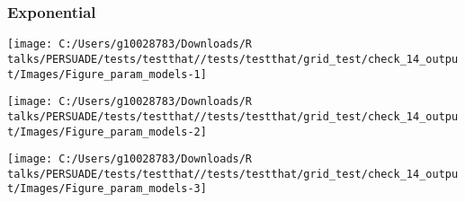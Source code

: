 \documentclass[
]{article}
\begin{document}
\clearpage

\begin{table}[H]
\centering
\caption{\label{tab:Table_2}Goodness of fit statistics}
\centering
{}
\end{table}

\clearpage

\clearpage

\subsubsection{Exponential}\label{exponential}

\begin{flushleft}\texttt{[image: C:/Users/g10028783/Downloads/R talks/PERSUADE/tests/testthat//tests/testthat/grid\_test/check\_14\_output/Images/Figure\_param\_models-1]} \end{flushleft}

\begin{flushleft}\texttt{[image: C:/Users/g10028783/Downloads/R talks/PERSUADE/tests/testthat//tests/testthat/grid\_test/check\_14\_output/Images/Figure\_param\_models-2]} \end{flushleft}

\begin{flushleft}\texttt{[image: C:/Users/g10028783/Downloads/R talks/PERSUADE/tests/testthat//tests/testthat/grid\_test/check\_14\_output/Images/Figure\_param\_models-3]} \end{flushleft}
\end{document}
